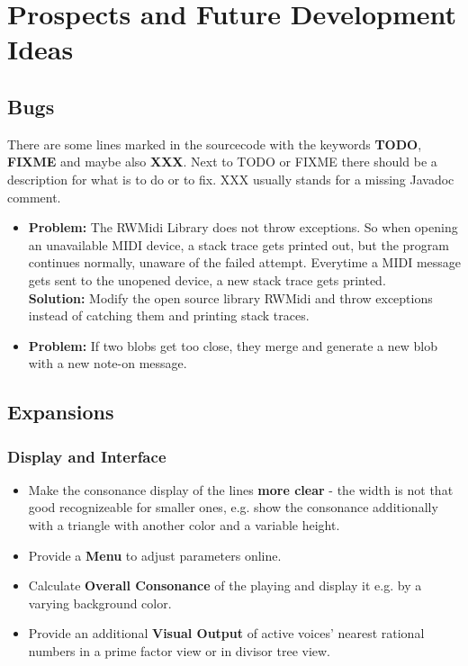 \documentclass[12pt,a4paper,titlepage,oneside]{report}
\begin{document}
\chapter{Prospects and Future Development Ideas}
\label{chap:future}


\section{Bugs}

There are some lines marked in the sourcecode with the keywords \textbf{TODO}, \textbf{FIXME} and maybe also \textbf{XXX}. Next to TODO or FIXME there should be a description for what is to do or to fix. XXX usually stands for a missing Javadoc comment.

\begin{itemize}
	\item \textbf{Problem:} The RWMidi Library does not throw exceptions. So when opening an unavailable MIDI device, a stack trace gets printed out, but the program continues normally, unaware of the failed attempt. Everytime a MIDI message gets sent to the unopened device, a new stack trace gets printed. \\
	\textbf{Solution:} Modify the open source library RWMidi and throw exceptions instead of catching them and printing stack traces.

	\item \textbf{Problem:} If two blobs get too close, they merge and generate a new blob with a new note-on message.
\end{itemize}


\section{Expansions}


\subsection{Display and Interface}

\begin{itemize}

	\item Make the consonance display of the lines \textbf{more clear} - the width is not that good recognizeable for smaller ones, e.g. show the consonance additionally with a triangle with another color and a variable height.

	\item Provide a \textbf{Menu} to adjust parameters online.
	
	\item Calculate \textbf{Overall Consonance} of the playing and display it e.g. by a varying background color.

	\item Provide an additional \textbf{Visual Output} of active voices' nearest rational numbers in a prime factor view or in divisor tree view.

\end{itemize}
\end{document}
